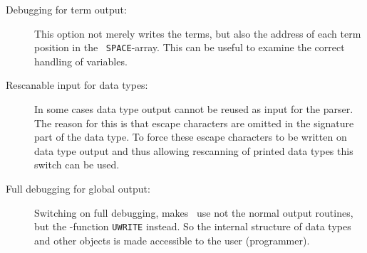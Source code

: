 \begin{description}
\item[Debugging for term output:] This option not merely writes the terms, 
  but also
  the address of each term position in the \ALDES\ {\tt SPACE}-array. 
  This can be
  useful to examine the correct handling of variables.
\item[Rescanable input for data types:] In some cases data type output cannot
  be reused as input for the parser. 
  The reason for this is that escape characters
  are omitted in the signature part of the data type. 
  To force these escape characters
  to be written on data type output and thus allowing rescanning of
  printed data types  this switch can be used.
\item[Full debugging for global output:]
  Switching on full debugging, makes \redux\  use not the normal output
  routines, but the \ALDES-function {\tt UWRITE} instead.
  So the internal structure of data types and other objects is made 
  accessible to  the user (programmer).
\end{description}
